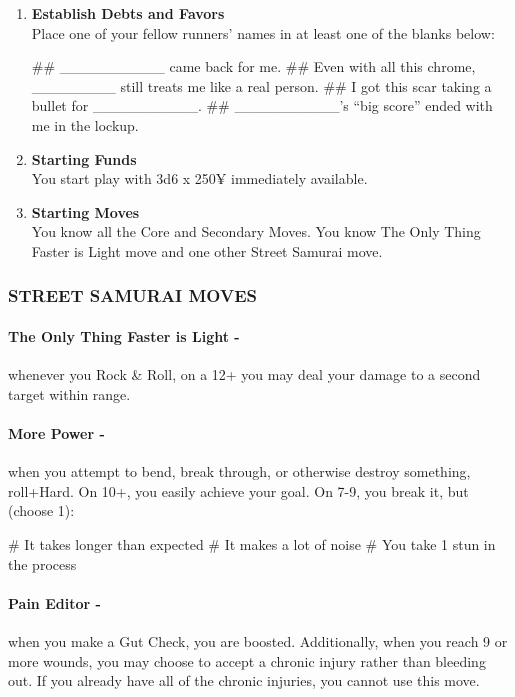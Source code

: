 \begin{enumerate}
    \item \textbf{Establish Debts and Favors} \\
    Place one of your fellow runners’ names in at least one of the blanks below:
        \begin{easylist}
            ## \_\_\_\_\_\_\_\_\_\_ came back for me.
            ## Even with all this chrome, \_\_\_\_\_\_\_\_ still treats me like a real person.
            ## I got this scar taking a bullet for \_\_\_\_\_\_\_\_\_\_.
            ## \_\_\_\_\_\_\_\_\_\_’s “big score” ended with me in the lockup.
        \end{easylist}            
    
    \item \textbf{Starting Funds} \\
    You start play with 3d6 x 250¥ immediately available.
    
    \item \textbf{Starting Moves} \\
    You know all the Core and Secondary Moves. You know The Only Thing Faster is Light move and one other Street Samurai move.
\end{enumerate}

\subsubsection{STREET SAMURAI MOVES}
\paragraph{The Only Thing Faster is Light -} whenever you Rock \& Roll, on a 12+ you may deal your damage to a second target within range.

\paragraph{More Power -} when you attempt to bend, break through, or otherwise destroy something, roll+Hard. On 10+, you easily achieve your goal. On 7-9, you break it, but (choose 1):
    \begin{easylist}
        # It takes longer than expected
        # It makes a lot of noise
        # You take 1 stun in the process
    \end{easylist}

\paragraph{Pain Editor -} when you make a Gut Check, you are boosted. Additionally, when you reach 9 or more wounds, you may choose to accept a chronic injury rather than bleeding out. If you already have all of the chronic injuries, you cannot use this move.


